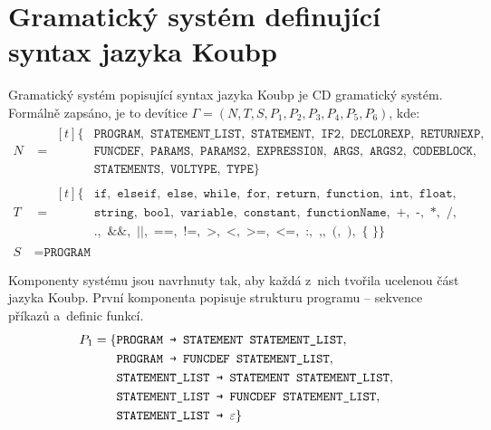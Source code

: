 \section{Gramatický systém definující syntax jazyka Koubp}\label{kap_cdgs_koubp}
Gramatický systém popisující syntax jazyka Koubp je CD gramatický systém.
Formálně zapsáno, je to devítice $\Gamma = (N, T, S, P_1, P_2, P_3, P_4, P_5, P_6)$, kde:
\begin{align*}
    N & = 
        \begin{aligned}[t]
          \{&\texttt{PROGRAM}, \texttt{ STATEMENT\_LIST}, \texttt{ STATEMENT}, \texttt{ IF2}, \texttt{ DECLOREXP}, \texttt{ RETURNEXP},\\
            &\texttt{FUNCDEF}, \texttt{ PARAMS}, \texttt{ PARAMS2}, \texttt{ EXPRESSION}, \texttt{ ARGS}, \texttt{ ARGS2}, \texttt{ CODEBLOCK},\\
            &\texttt{STATEMENTS}, \texttt{ VOLTYPE}, \texttt{ TYPE}\}
        \end{aligned}\\
    T & = 
        \begin{aligned}[t]
          \{&\texttt{if}, \texttt{ elseif}, \texttt{ else}, \texttt{ while}, \texttt{ for}, \texttt{ return}, \texttt{ function}, \texttt{ int}, \texttt{ float},\\
            &\texttt{string}, \texttt{ bool}, \texttt{ variable}, \texttt{ constant}, \texttt{ functionName}, \texttt{ +}, \texttt{ -}, \texttt{ *}, \texttt{ /},\\
            &\texttt{.}, \texttt{ \&\&}, \texttt{ ||}, \texttt{ ==}, \texttt{ !=}, \texttt{ >}, \texttt{ <}, \texttt{ >=}, \texttt{ <=}, \texttt{ :}, \texttt{ ,}, \texttt{ (}, \texttt{ )}, \texttt{ \{} \texttt{ \}}\}
        \end{aligned}\\
    S~& = \texttt{PROGRAM}
\end{align*}

Komponenty systému jsou navrhnuty tak, aby každá z~nich tvořila ucelenou část jazyka Koubp.
První komponenta popisuje strukturu programu -- sekvence příkazů a~definic funkcí.
\begin{equation*}
    P_1 = \{ 
        \begin{aligned}[t] 
            &\texttt{PROGRAM \textrightarrow{} STATEMENT STATEMENT\textunderscore LIST},\\
            &\texttt{PROGRAM \textrightarrow{} FUNCDEF STATEMENT\textunderscore LIST},\\
            &\texttt{STATEMENT\textunderscore LIST \textrightarrow{} STATEMENT STATEMENT\textunderscore LIST},\\
            &\texttt{STATEMENT\textunderscore LIST \textrightarrow{} FUNCDEF STATEMENT\textunderscore LIST},\\
            &\texttt{STATEMENT\textunderscore LIST \textrightarrow{} }\varepsilon\}
        \end{aligned}
\end{equation*}

